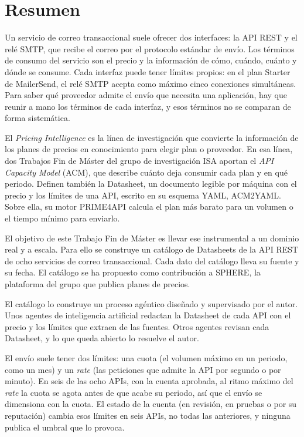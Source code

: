 \chapter*{Resumen}
Un servicio de correo transaccional suele ofrecer dos interfaces: la API REST y el relé SMTP,
que recibe el correo por el protocolo estándar de envío. Los términos de consumo del servicio
son el precio y la información de cómo, cuándo, cuánto y dónde se consume. Cada interfaz puede
tener límites propios: en el plan Starter de MailerSend, el relé SMTP acepta como máximo cinco
conexiones simultáneas. Para saber qué proveedor admite el envío que necesita una aplicación, hay que
reunir a mano los términos de cada interfaz, y esos términos no se comparan de forma
sistemática.

El \textit{Pricing Intelligence} es la línea de investigación que convierte la información de
los planes de precios en conocimiento para elegir plan o proveedor. En esa línea, dos
Trabajos Fin de Máster del grupo de investigación ISA aportan el \textit{API Capacity Model}
(ACM), que describe cuánto deja consumir cada plan y en qué periodo. Definen también la
Datasheet, un documento legible por máquina con el precio y los límites de una API, escrito en
su esquema YAML, ACM2YAML. Sobre ella, su motor PRIME4API calcula el plan más barato para un
volumen o el tiempo mínimo para enviarlo.

El objetivo de este Trabajo Fin de Máster es llevar ese instrumental a un dominio real y a escala.
Para ello se construye un catálogo de Datasheets de la API REST de ocho servicios de correo
transaccional. Cada dato del catálogo lleva su fuente y su fecha.
El catálogo se ha propuesto como contribución a SPHERE, la plataforma del grupo que publica
planes de precios.

El catálogo lo construye un proceso agéntico diseñado y supervisado por el autor. Unos agentes
de inteligencia artificial redactan la Datasheet de cada API con el precio y los límites que
extraen de las fuentes. Otros agentes revisan
cada Datasheet, y lo que queda abierto lo resuelve el autor.

El envío suele tener dos límites: una cuota (el volumen máximo en un periodo, como un mes) y
un \textit{rate} (las peticiones que admite la API por segundo o por minuto). En seis de las
ocho APIs, con la cuenta aprobada, al ritmo máximo del \textit{rate} la cuota se agota antes
de que acabe su periodo, así que el envío se dimensiona con la cuota. El estado de la cuenta
(en revisión, en pruebas o por su reputación) cambia esos límites en seis APIs, no todas las anteriores,
y ninguna publica el umbral que lo provoca.

